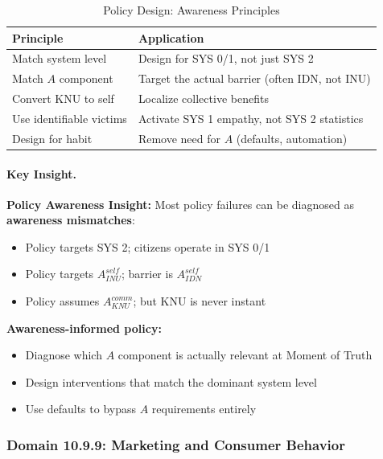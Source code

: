 \begin{table}[htbp]
\centering
\caption{Policy Design: Awareness Principles}
\label{tab:policy-design}
\renewcommand{\arraystretch}{1.3}
\begin{tabular}{@{}ll@{}}
\toprule
\textbf{Principle} & \textbf{Application} \\
\midrule
Match system level & Design for SYS 0/1, not just SYS 2 \\
Match $A$ component & Target the actual barrier (often IDN, not INU) \\
Convert KNU to self & Localize collective benefits \\
Use identifiable victims & Activate SYS 1 empathy, not SYS 2 statistics \\
Design for habit & Remove need for $A$ (defaults, automation) \\
\bottomrule
\end{tabular}
\end{table}

\paragraph{Key Insight.}
\begin{tcolorbox}[colback=yellow!10!white, colframe=yellow!50!black]
\textbf{Policy Awareness Insight:}
Most policy failures can be diagnosed as \textbf{awareness mismatches}:

\begin{itemize}
\item Policy targets SYS 2; citizens operate in SYS 0/1
\item Policy targets $A^{self}_{INU}$; barrier is $A^{self}_{IDN}$
\item Policy assumes $A^{comm}_{KNU}$; but KNU is never instant
\end{itemize}

\textbf{Awareness-informed policy:}
\begin{itemize}
\item Diagnose which $A$ component is actually relevant at Moment of Truth
\item Design interventions that match the dominant system level
\item Use defaults to bypass $A$ requirements entirely
\end{itemize}
\end{tcolorbox}

\subsubsection{Domain 10.9.9: Marketing and Consumer Behavior}
\label{subsubsec:awareness-marketing}

